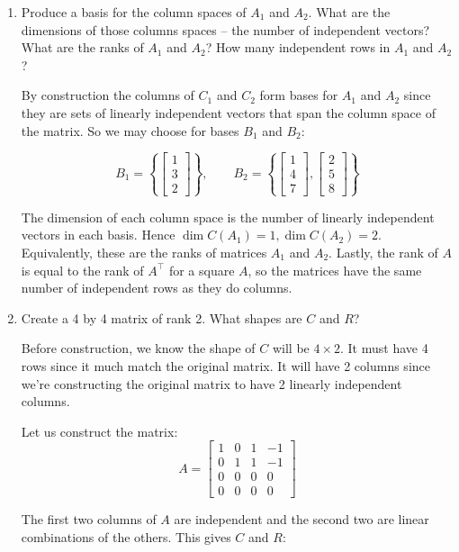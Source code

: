 \documentclass{scrartcl}
\begin{document}
\begin{enumerate}
\item Produce a basis for the column spaces of $A_1$ and $A_2$. What are the dimensions of those columns spaces -- the number of independent vectors? What are the ranks of $A_1$ and $A_2$? How many independent rows in $A_1$ and $A_2$?

By construction the columns of $C_1$ and $C_2$ form bases for $A_1$ and $A_2$ since they are sets of linearly independent vectors that span the column space of the matrix. So we may choose for bases $B_1$ and $B_2$:

$$B_1 = \left\{\begin{bmatrix}
	1 \\ 3 \\ 2
\end{bmatrix}\right\}, \qquad B_2 = \left\{\begin{bmatrix}1 \\ 4 \\ 7\end{bmatrix}, \begin{bmatrix}
	2 \\ 5 \\ 8
\end{bmatrix}\right\}$$

The dimension of each column space is the number of linearly independent vectors in each basis. Hence $\dim C(A_1) = 1, \dim C(A_2) = 2$. Equivalently, these are the ranks of matrices $A_1$ and $A_2$. Lastly, the rank of $A$ is equal to the rank of $A^\top$ for a square $A$, so the matrices have the same number of independent rows as they do columns.

\item Create a 4 by 4 matrix of rank 2. What shapes are $C$ and $R$? 

Before construction, we know the shape of $C$ will be $4 \times 2$. It must have 4 rows since it much match the original matrix. It will have 2 columns since we're constructing the original matrix to have 2 linearly independent columns.

Let us construct the matrix:
$$A = \begin{bmatrix}
	1 & 0 & 1 & -1 \\ 0 & 1 & 1 & -1 \\ 0 & 0 & 0 & 0 \\ 0 & 0 & 0 & 0 
\end{bmatrix}$$

The first two columns of $A$ are independent and the second two are linear combinations of the others. This gives $C$ and $R$:


\end{enumerate}
\end{document}
